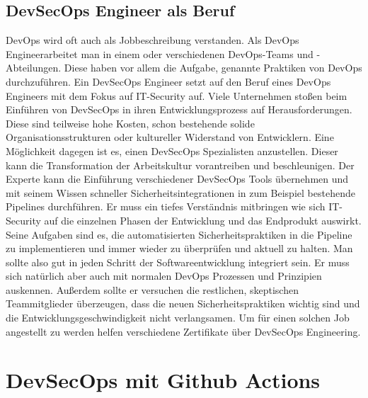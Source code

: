 \section{DevSecOps Engineer als Beruf}
DevOps wird oft auch als Jobbeschreibung verstanden. Als \glqq DevOps Engineer\grqq\enspace arbeitet man in einem oder verschiedenen DevOps-Teams und -Abteilungen. Diese haben vor allem die Aufgabe, genannte Praktiken von DevOps durchzuführen. \cite{dev-ops}
Ein DevSecOps Engineer setzt auf den Beruf eines DevOps Engineers mit dem Fokus auf IT-Security auf.
Viele Unternehmen stoßen beim Einführen von DevSecOps in ihren Entwicklungsprozess auf Herausforderungen. Diese sind teilweise hohe Kosten, schon bestehende solide Organisationsstrukturen oder kultureller Widerstand von Entwicklern. Eine Möglichkeit dagegen ist es, einen DevSecOps Spezialisten anzustellen. Dieser kann die Transformation der Arbeitskultur vorantreiben und beschleunigen. Der Experte kann die Einführung verschiedener DevSecOps Tools übernehmen und mit seinem Wissen schneller Sicherheitsintegrationen in zum Beispiel bestehende Pipelines durchführen. \cite{grey}
Er muss ein tiefes Verständnis mitbringen wie sich IT-Security auf die einzelnen Phasen der Entwicklung und das Endprodukt auswirkt. Seine Aufgaben sind es, die automatisierten Sicherheitspraktiken in die Pipeline zu implementieren und immer wieder zu überprüfen und aktuell zu halten. Man sollte also gut in jeden Schritt der Softwareentwicklung integriert sein. Er muss sich natürlich aber auch mit normalen DevOps Prozessen und Prinzipien auskennen. Außerdem sollte er versuchen die restlichen, skeptischen Teammitglieder überzeugen, dass die neuen Sicherheitspraktiken wichtig sind und die Entwicklungsgeschwindigkeit nicht verlangsamen. Um für einen solchen Job angestellt zu werden helfen verschiedene Zertifikate über DevSecOps Engineering. \cite{Cobb2019-lq}

\chapter{DevSecOps mit Github Actions}

